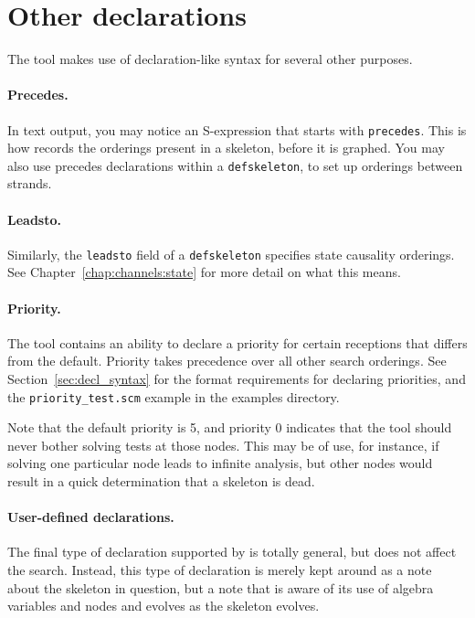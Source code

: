 \section{Other declarations}
\label{sec:other_decls}

The tool makes use of declaration-like syntax for several other
purposes.

\paragraph{Precedes.}
 In {\cpsa} text output, you may notice an
S-expression that starts with \texttt{precedes}.  This is how {\cpsa}
records the orderings present in a skeleton, before it is graphed.
You may also use precedes declarations within a \texttt{defskeleton},
to set up orderings between strands.

\paragraph{Leadsto.}  Similarly, the \texttt{leadsto} field of
a \texttt{defskeleton} specifies state causality orderings.  See
Chapter~\ref{chap:channels:state} for more detail on what this means.

\paragraph{Priority.}
 The tool contains an ability to declare a priority
for certain receptions that differs from the default.  Priority takes
precedence over all other search orderings.  See
Section~\ref{sec:decl_syntax} for the format requirements for
declaring priorities, and the \texttt{priority\_test.scm} example in the
examples directory.

Note that the default priority is 5, and priority 0 indicates that the
tool should never bother solving tests at those nodes.  This may be of
use, for instance, if solving one particular node leads to infinite
analysis, but other nodes would result in a quick determination that a
skeleton is dead.

\paragraph{User-defined declarations.}
The final type of declaration supported by {\cpsa} is totally general,
but does not affect the search.  Instead, this type of declaration is
merely kept around as a note about the skeleton in question, but a
note that is aware of its use of algebra variables and nodes and
evolves as the skeleton evolves.

